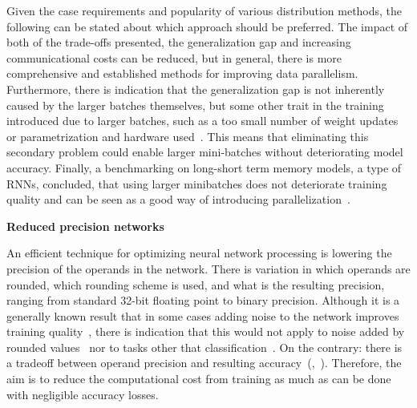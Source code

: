 Given the case requirements and popularity of various distribution methods, the following can be stated about which approach should be preferred. The impact of both of the trade-offs presented, the generalization gap and increasing communicational costs can be reduced, but in general, there is more comprehensive and established methods for improving data parallelism. Furthermore, there is indication that the generalization gap is not inherently caused by the larger batches themselves, but some other trait in the training introduced due to larger batches, such as a too small number of weight updates~\cite{hofferTrainLongerGeneralize2018} or parametrization and hardware used~\cite{shallueMeasuringEffectsData2019}. This means that eliminating this secondary problem could enable larger mini-batches without deteriorating model accuracy. Finally, a benchmarking on long-short term memory models, a type of RNNs, concluded, that using larger minibatches does not deteriorate training quality and can be seen as a good way of introducing parallelization~\cite{breuelBenchmarkingLSTMNetworks2015}.

\textbf{Reduced precision networks}

An efficient technique for optimizing neural network processing is lowering the precision of the operands in the network. There is variation in which operands are rounded, which rounding scheme is used, and what is the resulting precision, ranging from standard 32-bit floating point to binary precision. Although it is a generally known result that in some cases adding noise to the network improves training quality~\cite{murrayEnhancedMLPPerformance1994}, there is indication that this would not apply to noise added by rounded values~\cite{murrayEnhancedMLPPerformance1994} nor to tasks other that classification~\cite{anEffectsAddingNoise1996}. On the contrary: there is a tradeoff between operand precision and resulting accuracy~(\cite{desaHighAccuracyLowPrecisionTraining2018},~\cite{courbariauxTrainingDeepNeural2015}). Therefore, the aim is to reduce the computational cost from training as much as can be done with negligible accuracy losses.

